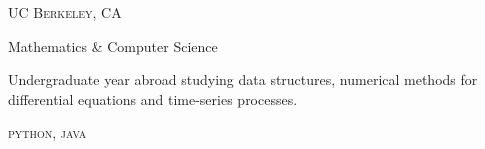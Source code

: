 \textsc{\small{UC Berkeley, CA
}}

{\raggedright\large {
    Mathematics \& Computer Science
} \\}

\normalsize{
    Undergraduate year abroad studying data structures, numerical methods for differential equations and time-series processes.
}

\textsc{\small{\color{highlight}
    python, java
}}\\
